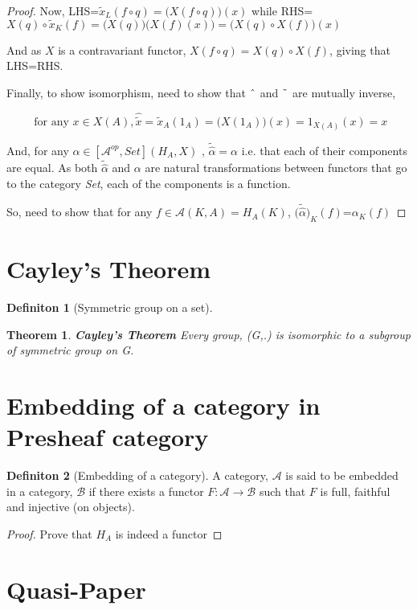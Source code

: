 \documentclass[18pt,a4paper]{article}
\newtheorem{theorem}{Theorem}[section]
\theoremstyle{definition}
\newtheorem{definition}{Definiton}[section]
\begin{document}
\begin{proof}
	Now, LHS=$\tilde{x}_L(f \circ q ) =\Big( X(f \circ q)\Big)(x)$
	while RHS=$X(q) \circ \tilde{x}_K(f) =\Big(X(q)\Big) \big(X(f)(x)\big)
=\Big(X(q) \circ X(f)\Big) (x) $

And as $X$ is a contravariant functor, $X(f \circ q)= X(q) \circ X(f)$, giving that LHS=RHS.

Finally, to show isomorphism, need to show that $\string ^ $ and $\string ~ $ are mutually inverse,

\[ \text{ for any } x \in X(A),
\hat{\tilde{x}}=\tilde{x}_A (1_A)=\Big(X(1_A) \Big) (x)=1_{X(A)}(x)=x \]

And, for any $\alpha \in [\mathcal{A}^{op}, Set](H_A,X)$ , $\tilde{\hat{\alpha}}=\alpha$ i.e. that each of their
components are equal. As both $\tilde{\hat{\alpha}}$ and $\alpha$ are natural transformations
between functors that go to the category \textit{Set}, each of the components is a function.

So, need to show that for any $f \in \mathcal{A} (K,A)=H_A(K)$,
$\Big(\tilde{\hat{\alpha}}\Big)_K(f)$=$\alpha_K(f)$


\end{proof}

\section{Cayley's Theorem}%
\begin{definition}[Symmetric group on a set] %

\end{definition}



\begin{theorem}{\textbf{Cayley's Theorem}} %
	Every group, (G,.) is isomorphic to a subgroup of symmetric group on G.
\end{theorem}

\section{Embedding of a category in Presheaf category}%

\begin{definition}[Embedding of a category] %
	A category, $\mathcal{A}$  is said to be embedded in a category, $\mathcal{B}$ if there exists a
	functor $F: \mathcal{A} \to \mathcal{B} $ such that $F$ is full, faithful and injective (on objects).
\end{definition} %

\begin{proof}
	Prove that $H_A$ is indeed a functor

\end{proof}




\section{Quasi-Paper}%
\label{sec:quasi_paper}
\end{document}
